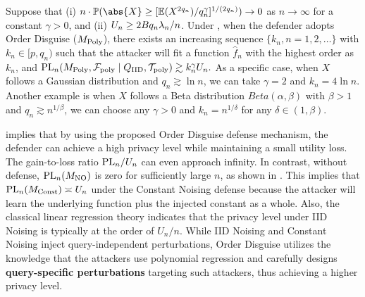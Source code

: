         \begin{theorem}\label{thm:pos}
        Suppose that (i) $n \cdot \P(\abs{X} \geq [\E (X^{2q_n}) / q_n^\gamma ]^{1/(2q_n)}) \to 0$ as $n\to\infty$ for a constant $\gamma > 0$, and (ii) $U_n \geq 2 B q_n \lambda_n  /n$. 
        Under , when the defender adopts Order Disguise ($M_{\textrm{Poly}}$), there exists an increasing sequence $\{k_n, n=1,2,\dots \}$ with $k_n \in [p, q_n)$ such that the attacker will fit a function $\hat{f}_n$ with the highest order as $k_n$, and $\textrm{PL}_n(M_{\textrm{Poly}},\mathcal{F}_{\textrm{poly}}\mid Q_{\textrm{IID}},\mathcal{T}_{\textrm{poly}}) \gtrsim k_n^\gamma U_n.$ 
        As a specific case, when $X$ follows a Gaussian distribution and $q_n\gtrsim \ln n$, we can take $\gamma=2$ and $k_n=4\ln n$.
        Another example is when $X$ follows a Beta distribution $Beta(\alpha,\beta)$ with $\beta>1$ and $q_n\gtrsim n^{1/\beta}$, we can choose any $\gamma > 0$ and $k_n=n^{1/\delta}$ for any $\delta \in (1, \beta)$.  
        \end{theorem}

         implies that by using the proposed Order Disguise defense mechanism, the defender can achieve a high privacy level while maintaining a small utility loss. The gain-to-loss ratio $\textrm{PL}_n/U_n$ can even approach infinity. 
        In contrast, without defense, $\textrm{PL}_n(M_{\textrm{NO}})$ is zero for sufficiently large $n$, as shown in . This implies that $\textrm{PL}_n(M_{\textrm{Const}})\asymp U_n$ under the Constant Noising defense because the attacker will learn the underlying function plus the injected constant as a whole. Also, the classical linear regression theory indicates that the privacy level under IID Noising is typically at the order of $U_n/n$. 
        While IID Noising and Constant Noising inject query-independent perturbations, Order Disguise utilizes the knowledge that the attackers use polynomial regression and carefully designs \textbf{query-specific perturbations} targeting such attackers, thus achieving a higher privacy level.

